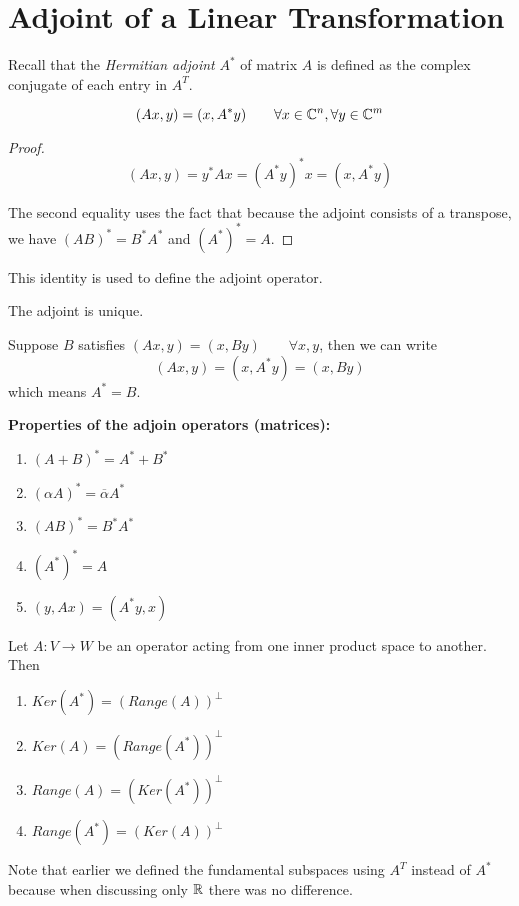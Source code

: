 \section{Adjoint of a Linear Transformation} 
Recall that the \textit{Hermitian adjoint} $A^{*}$ of matrix $A$ is defined as the complex conjugate of each entry in $A^{T}$. 

\begin{theorem}
$$(Ax, y) = (x, A^{*}y) \qquad \forall x \in \mathbb{C}^{n}, \forall y \in \mathbb{C}^{m}$$
\end{theorem}

\begin{proof}
$$(Ax, y) = y^{*} Ax = (A^{*} y)^{*} x = (x, A^{*} y)$$

The second equality uses the fact that because the adjoint consists of a transpose, we have $(AB)^{*} = B^{*} A^{*}$ and $(A^{*})^{*} = A$.  
\end{proof}

This identity is used to define the adjoint operator. 

\begin{lemma}
The adjoint is unique. 
\end{lemma}

\begin{lproof}
Suppose $B$ satisfies $(Ax, y) = (x, By) \qquad \forall x, y$, then we can write 
$$(Ax, y) = (x, A^{*} y) = (x, By)$$
which means $A^{*} = B$.
\end{lproof}

\textbf{Properties of the adjoin operators (matrices):}
\begin{enumerate}
	\item $(A + B)^{*} = A^{*} + B^{*}$ 
	\item $(\alpha A)^{*} = \overline{\alpha} A^{*}$ 
	\item $(AB)^{*} = B^{*} A^{*}$ 
	\item $(A^{*})^{*} = A$
	\item $(y, Ax) = (A^{*}y, x)$ 
\end{enumerate}

\begin{theorem}
Let $A: V \rightarrow W$ be an operator acting from one inner product space to another. Then 
\begin{enumerate}
	\item $Ker(A^{*}) = (Range(A))^{\perp}$ 
	\item $Ker(A) = (Range(A^{*}))^{\perp}$ 
	\item $Range(A) = (Ker(A^{*}))^{\perp}$ 
	\item $Range(A^{*}) = (Ker(A))^{\perp}$
\end{enumerate}

Note that earlier we defined the fundamental subspaces using $A^{T}$ instead of $A^{*}$ because when discussing only $\mathbb{R}$ there was no difference. 
\end{theorem}

